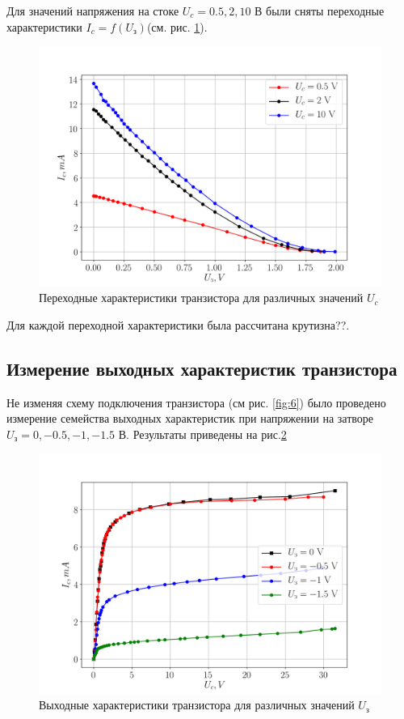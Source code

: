 Для значений напряжения на стоке $U_c = 0.5,2,10$ В были сняты переходные характеристики $I_c = f(U_{\text{з}})$(см.
рис. \ref{fig:7}). 
\begin{figure}[h!]
	\centering
	\includegraphics[width=0.7\linewidth]{fig/task1.png}
	\caption{Переходные характеристики транзистора для различных значений $U_c$}
	\label{fig:7}
\end{figure}

Для каждой переходной характеристики была рассчитана крутизна??.

\subsection{Измерение выходных характеристик транзистора}
Не изменяя схему подключения транзистора (см рис. \ref{fig:6}) было проведено измерение семейства выходных характеристик
при напряжении на затворе $U_{\text{з}} = 0,-0.5,-1,-1.5$ В. Результаты приведены на рис.\ref{fig:8}

\begin{figure}[h!]
	\centering
	\includegraphics[width=0.7\linewidth]{fig/task2.png}
	\caption{Выходные характеристики транзистора для различных значений $U_{\text{з}}$}
	\label{fig:8}
\end{figure}

